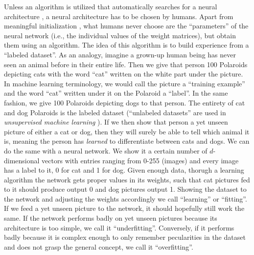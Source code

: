 Unless an algorithm is utilized that automatically searches for a neural architecture \cite{elsken2019neural}, a neural architecture has to be chosen by humans. Apart from meaningful initialization \cite{wandb_initialization}, what humans never choose are the \enquote{parameters} of the neural network (i.e., the individual values of the weight matrices), but obtain them using an algorithm. The idea of this algorithm is to build experience from a \enquote{labeled dataset}. As an analogy, imagine a grown-up human being has never seen an animal before in their entire life. Then we give that person 100 Polaroids depicting cats with the word \enquote{cat} written on the white part under the picture. In machine learning terminology, we would call the picture a \enquote{training example} and the word \enquote{cat} written under it on the Polaroid a \enquote{label}. In the same fashion, we give 100 Polaroids depicting dogs to that person. The entirety of cat and dog Polaroids is the labeled dataset (\enquote{unlabeled datasets} are used in \textit{unsupervised machine learning} \cite{ghahramani2003unsupervised}). If we then show that person a yet unseen picture of either a cat or dog, then they will surely be able to tell which animal it is, meaning the person has \textit{learned} to differentiate between cats and dogs. We can do the same with a neural network. We show it a certain number of $d$-dimensional vectors with entries ranging from 0-255 (images) and every image has a label to it, 0 for cat and 1 for dog. Given enough data, thorugh a learning algorithm the network gets proper values in its weights, such that cat pictures fed to it should produce output 0 and dog pictures output 1. Showing the dataset to the network and adjusting the weights accordingly we call \enquote{learning} or \enquote{fitting}. If we feed a yet unseen picture to the network, it should hopefully still work the same. If the network performs badly on yet unseen pictures because its architecture is too simple, we call it \enquote{underfitting}. Conversely, if it performs badly because it is complex enough to only remember pecularities in the dataset and does not grasp the general concept, we call it \enquote{overfitting}.

